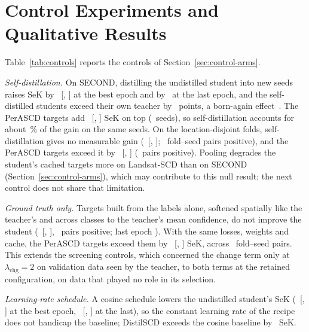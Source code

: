 \documentclass[journal]{IEEEtran}
\begin{document}
\section{Control Experiments and Qualitative Results}
\label{sec:controls}

Table~\ref{tab:controls} reports the controls of Section~\ref{sec:control-arms}.

\emph{Self-distillation.} On SECOND, distilling the undistilled student into new seeds raises SeK
by \RevSelfSecAbs\ [\RevSelfSecLo, \RevSelfSecHi] at the best epoch and by \RevSelfSecFinalAbs\ at the
last epoch, and the self-distilled students exceed their own teacher by \RevSelfTSecAbs\ points, a
born-again effect~\cite{furlanello2018born}. The PerASCD targets add \RevKdSelfSecAbs\
[\RevKdSelfSecLo, \RevKdSelfSecHi] SeK on top (\RevKdSelfSecPos\ seeds), so self-distillation
accounts for about \RevSelfShare\,\% of the gain on the same seeds. On the location-disjoint folds,
self-distillation gives no measurable gain (\RevSelfLan\ [\RevSelfLanLo, \RevSelfLanHi]; \RevSelfLanPos\
fold--seed pairs positive), and the PerASCD targets exceed it by \RevKdSelfLanAbs\ [\RevKdSelfLanLo,
\RevKdSelfLanHi] (\RevKdSelfLanPos\ pairs positive). Pooling degrades the student's cached targets more on
Landsat-SCD than on SECOND (Section~\ref{sec:control-arms}), which may contribute to this null
result; the next control does not share that limitation.

\emph{Ground truth only.} Targets built from the labels alone, softened spatially like the
teacher's and across classes to the teacher's mean confidence, do not improve the student
(\RevCtlLan\ [\RevCtlLanLo, \RevCtlLanHi], \RevCtlLanPos\ pairs positive; last epoch
\RevCtlLanFinal). With the same losses, weights and cache, the PerASCD targets exceed them by
\RevKdCtlLanAbs\ [\RevKdCtlLanLo, \RevKdCtlLanHi] SeK, across \RevKdCtlLanPos\ fold--seed pairs. This
extends the screening controls, which concerned the change term only at
$\lambda_{\mathrm{chg}}=2$ on validation data seen by the teacher, to both terms at the retained
configuration, on data that played no role in its selection.

\emph{Learning-rate schedule.} A cosine schedule lowers the undistilled student's SeK
(\RevCosSec\ [\RevCosSecLo, \RevCosSecHi] at the best epoch, \RevCosSecFinal\ [\RevCosSecFinalLo,
\RevCosSecFinalHi] at the last), so the constant learning rate of the recipe does not handicap the
baseline; DistilSCD exceeds the cosine baseline by \RevKdCosSecAbs\ SeK.
\end{document}
